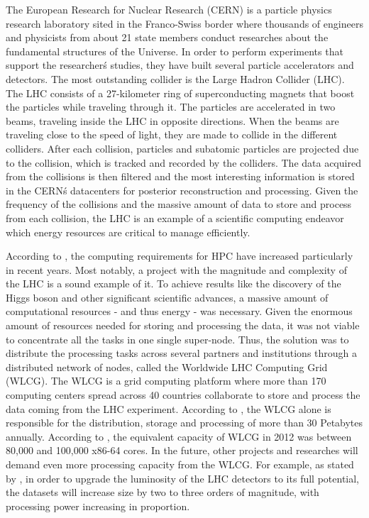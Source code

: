 The European Research for Nuclear Research (CERN) \cite{CERN} is a particle physics
research laboratory sited in the Franco-Swiss border where thousands of
engineers and physicists from about 21 state members conduct researches about the
fundamental structures of the Universe. In order to perform experiments that
support the researcher\'s studies, they have built several particle accelerators and detectors.
The most outstanding collider is the Large Hadron Collider (LHC). The LHC
consists of a 27-kilometer ring of superconducting magnets that boost the
particles while traveling through it. The particles are accelerated in two
beams, traveling inside the LHC in opposite directions. When the beams are
traveling close to the speed of light, they are made to collide in the different
colliders. After each collision, particles and subatomic particles are projected
due to the collision, which is tracked and recorded by the colliders. The data
acquired from the collisions is then filtered and the most interesting
information is stored in the CERN\'s datacenters for posterior reconstruction
and processing. Given the frequency of the collisions and the massive amount of
data to store and process from each collision, the LHC is an example of a scientific
computing endeavor which energy resources are critical to manage efficiently.  

According to  \cite{ACAT13ARM}, the computing requirements for HPC have increased 
particularly in recent years. Most notably, a project with the magnitude and complexity of the 
LHC is a sound example of it. To achieve results like the discovery of
the Higgs boson \cite{HIGGS1} \cite{HIGGS2} and other significant scientific
advances, a massive amount of computational resources - and thus energy - was
necessary. Given the enormous amount of resources needed for storing and
processing the data, it was not viable to concentrate all the tasks in one
single super-node. Thus, the solution was to distribute the processing tasks across 
several partners and institutions through a distributed network of nodes, called
the Worldwide LHC Computing Grid (WLCG). The WLCG \cite{WLCG} is a grid
computing platform where more than 170 computing centers spread across 40
countries \cite{WLCG} collaborate to store and process the data coming from the
LHC experiment. According to \cite{WLCG}, the WLCG alone is responsible for the distribution, 
storage and processing of more than 30 Petabytes annually. According to
\cite{ACAT13ARM}, the equivalent capacity of WLCG in 2012 was between 80,000 and 100,000 x86-64 cores.
In the future, other projects and researches will demand even more processing capacity from
the WLCG. For example, as stated by \cite{ACAT13ARM}, in order to upgrade the
luminosity of the LHC detectors to its full potential, the datasets will
increase size by two to three orders of magnitude, with processing power
increasing in proportion.

